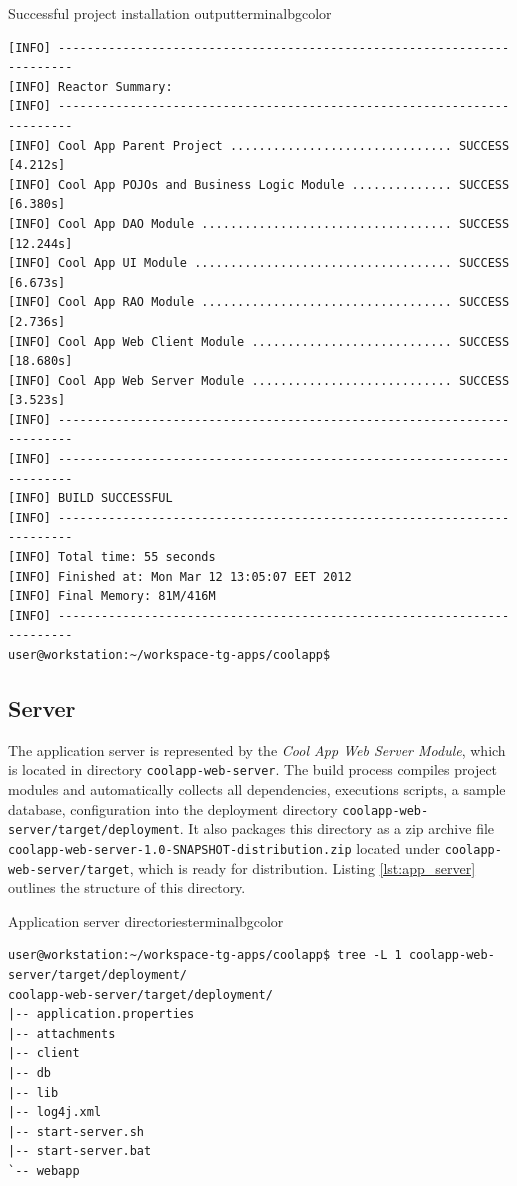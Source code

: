   \begin{code}{Successful project installation output}{\label{lst:mvn_clean_install_completed}}{terminalbgcolor}
      \begin{lstlisting}
[INFO] ------------------------------------------------------------------------
[INFO] Reactor Summary:
[INFO] ------------------------------------------------------------------------
[INFO] Cool App Parent Project ............................... SUCCESS [4.212s]
[INFO] Cool App POJOs and Business Logic Module .............. SUCCESS [6.380s]
[INFO] Cool App DAO Module ................................... SUCCESS [12.244s]
[INFO] Cool App UI Module .................................... SUCCESS [6.673s]
[INFO] Cool App RAO Module ................................... SUCCESS [2.736s]
[INFO] Cool App Web Client Module ............................ SUCCESS [18.680s]
[INFO] Cool App Web Server Module ............................ SUCCESS [3.523s]
[INFO] ------------------------------------------------------------------------
[INFO] ------------------------------------------------------------------------
[INFO] BUILD SUCCESSFUL
[INFO] ------------------------------------------------------------------------
[INFO] Total time: 55 seconds
[INFO] Finished at: Mon Mar 12 13:05:07 EET 2012
[INFO] Final Memory: 81M/416M
[INFO] ------------------------------------------------------------------------
user@workstation:~/workspace-tg-apps/coolapp$ 
      \end{lstlisting}
  \end{code}

\subsection{Server}

  The application server is represented by the \emph{Cool App Web Server Module}, which is located in directory \texttt{coolapp-web-server}.
  The build process compiles project modules and automatically collects all dependencies, executions scripts, a sample database, configuration into the deployment directory \texttt{coolapp-web-server/target/deployment}.
  It also packages this directory as a zip archive file \texttt{coolapp-web-server-1.0-SNAPSHOT-distribution.zip} located under \texttt{coolapp-web-server/target}, which is ready for distribution.
  Listing \ref{lst:app_server} outlines the structure of this directory.

  \begin{code}{Application server directories}{\label{lst:app_server}}{terminalbgcolor}
     \begin{lstlisting}
user@workstation:~/workspace-tg-apps/coolapp$ tree -L 1 coolapp-web-server/target/deployment/
coolapp-web-server/target/deployment/
|-- application.properties
|-- attachments
|-- client
|-- db
|-- lib
|-- log4j.xml
|-- start-server.sh
|-- start-server.bat
`-- webapp
     \end{lstlisting}
  \end{code}

